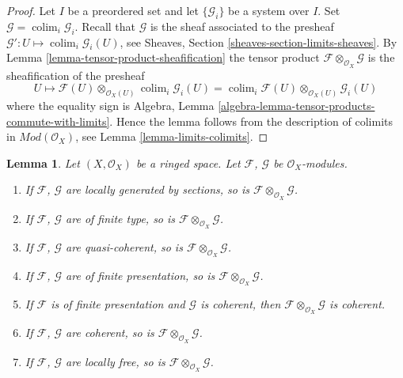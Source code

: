 \documentclass{stacks-project}
\theoremstyle{plain}
\newtheorem{lemma}[subsection]{Lemma}
\theoremstyle{definition}
\theoremstyle{remark}
\numberwithin{equation}{subsection}
\def\colim{\mathop{\mathrm{colim}}\nolimits}
\begin{document}
\begin{proof}
Let $I$ be a preordered set and let $\{\mathcal{G}_i\}$ be
a system over $I$. Set $\mathcal{G} = \colim_i \mathcal{G}_i$.
Recall that $\mathcal{G}$ is the sheaf associated to the presheaf
$\mathcal{G}' : U \mapsto \colim_i \mathcal{G}_i(U)$, see
Sheaves, Section \ref{sheaves-section-limits-sheaves}.
By
Lemma \ref{lemma-tensor-product-sheafification}
the tensor product $\mathcal{F} \otimes_{\mathcal{O}_X} \mathcal{G}$
is the sheafification of the presheaf
$$
U \longmapsto
\mathcal{F}(U) \otimes_{\mathcal{O}_X(U)} \colim_i \mathcal{G}_i(U) =
\colim_i \mathcal{F}(U) \otimes_{\mathcal{O}_X(U)} \mathcal{G}_i(U)
$$
where the equality sign is
Algebra, Lemma \ref{algebra-lemma-tensor-products-commute-with-limits}.
Hence the lemma follows from the description of colimits in
$\textit{Mod}(\mathcal{O}_X)$, see Lemma \ref{lemma-limits-colimits}.
\end{proof}

\begin{lemma}
\label{lemma-tensor-product-permanence}
Let $(X, \mathcal{O}_X)$ be a ringed space.
Let $\mathcal{F}$, $\mathcal{G}$ be $\mathcal{O}_X$-modules.
\begin{enumerate}
\item If $\mathcal{F}$, $\mathcal{G}$ are locally generated
by sections, so is $\mathcal{F} \otimes_{\mathcal{O}_X} \mathcal{G}$.
\item If $\mathcal{F}$, $\mathcal{G}$ are of finite type,
so is $\mathcal{F} \otimes_{\mathcal{O}_X} \mathcal{G}$.
\item If $\mathcal{F}$, $\mathcal{G}$ are quasi-coherent,
so is $\mathcal{F} \otimes_{\mathcal{O}_X} \mathcal{G}$.
\item If $\mathcal{F}$, $\mathcal{G}$ are of finite presentation,
so is $\mathcal{F} \otimes_{\mathcal{O}_X} \mathcal{G}$.
\item If $\mathcal{F}$ is of finite presentation and $\mathcal{G}$ is coherent,
then $\mathcal{F} \otimes_{\mathcal{O}_X} \mathcal{G}$ is coherent.
\item If $\mathcal{F}$, $\mathcal{G}$ are coherent,
so is $\mathcal{F} \otimes_{\mathcal{O}_X} \mathcal{G}$.
\item If $\mathcal{F}$, $\mathcal{G}$ are locally free,
so is $\mathcal{F} \otimes_{\mathcal{O}_X} \mathcal{G}$.
\end{enumerate}
\end{lemma}
\end{document}
